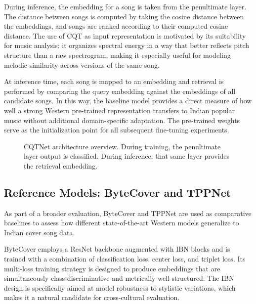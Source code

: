 \documentclass[conference]{IEEEtran}
\begin{document}
During inference, the embedding for a song is taken from the penultimate layer. The distance between songs is computed by taking the cosine distance between the embeddings, and songs are ranked according to their computed cosine distance. The use of CQT as input representation is motivated by its suitability for music analysis: it organizes spectral energy in a way that better reflects pitch structure than a raw spectrogram, making it especially useful for modeling melodic similarity across versions of the same song.

At inference time, each song is mapped to an embedding and retrieval is performed by comparing the query embedding against the embeddings of all candidate songs. In this way, the baseline model provides a direct measure of how well a strong Western pre-trained representation transfers to Indian popular music without additional domain-specific adaptation. The pre-trained weights serve as the initialization point for all subsequent fine-tuning experiments.

\vspace{0.5em}
\begin{figure}[htbp]
    \centering
    \caption{CQTNet architecture overview. During training, the penultimate layer output is classified. During inference, that same layer provides the retrieval embedding.}
    \label{fig:cqtnet_arch}
\end{figure}
\vspace{0.5em}

\subsection{Reference Models: ByteCover and TPPNet}

As part of a broader evaluation, ByteCover and TPPNet are used as comparative baselines to assess how different state-of-the-art Western models generalize to Indian cover song data.

ByteCover employs a ResNet backbone augmented with IBN blocks and is trained with a combination of classification loss, center loss, and triplet loss. Its multi-loss training strategy is designed to produce embeddings that are simultaneously class-discriminative and metrically well-structured. The IBN design is specifically aimed at model robustness to stylistic variations, which makes it a natural candidate for cross-cultural evaluation.
\end{document}
